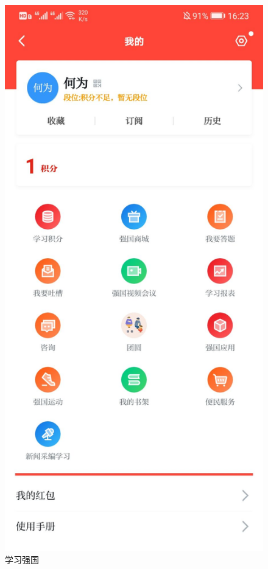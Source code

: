 \documentclass{article}
\begin{document}
\begin{itemize}
	\begin{figure}[h!]
		\centering
		\includegraphics[scale=0.2]{学习强国}
		\caption{学习强国}
		\label{fig:github}
	\end{figure}




\end{itemize}
\end{document}
